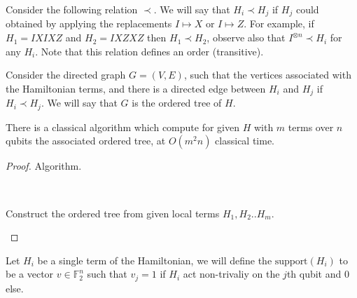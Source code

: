\documentclass{article}
\begin{document}
\begin{definition}
  Consider the following relation $\prec$. We will say that $H_{i} \prec H_{j}$ if $H_{j}$ could obtained by applying the replacements $I \mapsto X  $ or $ I \mapsto Z$. For example, if $H_{1} = IXIXZ$ and $H_{2}=IXZXZ$ then $H_{1}\prec H_{2}$, observe also that $I^{\otimes n} \prec H_{i}$ for any $H_{i}$. Note that this relation defines an order (transitive). 
\end{definition}
\begin{definition} 
  Consider the directed graph $G=\left( V,E \right)$, such that the vertices associated with the Hamiltonian terms, and there is a directed edge between $H_{i}$ and $H_{j}$ if $H_{i} \prec H_{j}$. We will say that $G$ is the ordered tree of $H$. 
\end{definition}

\begin{lemma}
  There is a classical algorithm which compute for given $H$ with $m$ terms over $n$ qubits the associated ordered tree, at $O\left( m^{2}n \right)$ classical time.  
\end{lemma}
\begin{proof} Algorithm.


\begin{algorithm}[H]
	\ \\ 
	\caption{Construct the ordered tree from given local terms $H_{1}, H_{2} .. H_{m}$.}
      \end{algorithm}
    \end{proof}
\begin{definition}
  Let \(H_{i}\) be a single term of the Hamiltonian, we will define the \( \text{support}(H_{i}) \) to be a vector \( v \in \mathbb{F}^{n}_2\) such that \(v_j = 1\) if \(H_{i}\) act non-trivaliy on the \(j\)th qubit and \(0\) else.
\end{definition}
\end{document}
